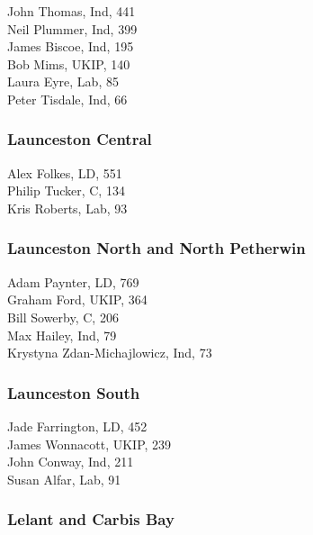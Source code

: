 \documentclass[a4paper,openany,10pt]{book}
\begin{document}


John Thomas, Ind, 441\\
Neil Plummer, Ind, 399\\
James Biscoe, Ind, 195\\
Bob Mims, UKIP, 140\\
Laura Eyre, Lab, 85\\
Peter Tisdale, Ind, 66\\


\subsubsection*{Launceston Central}



Alex Folkes, LD, 551\\
Philip Tucker, C, 134\\
Kris Roberts, Lab, 93\\


\subsubsection*{Launceston North and North Petherwin}



Adam Paynter, LD, 769\\
Graham Ford, UKIP, 364\\
Bill Sowerby, C, 206\\
Max Hailey, Ind, 79\\
{Krystyna Zdan-Michajlowicz}, Ind, 73\\


\subsubsection*{Launceston South}



Jade Farrington, LD, 452\\
James Wonnacott, UKIP, 239\\
John Conway, Ind, 211\\
Susan Alfar, Lab, 91\\


\subsubsection*{Lelant and Carbis Bay}
\end{document}
